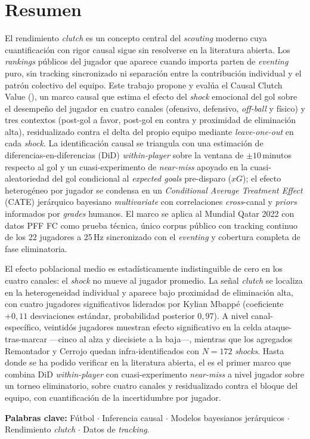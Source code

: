 \chapter*{Resumen}

El rendimiento \textit{clutch} es un concepto central del \textit{scouting}
moderno cuya cuantificación con rigor causal sigue sin resolverse en
la literatura abierta.
Los \textit{rankings} públicos del jugador que aparece cuando importa
parten de \textit{eventing} puro, sin tracking sincronizado ni separación
entre la contribución individual y el patrón colectivo del equipo. Este
trabajo propone y evalúa el Causal Clutch Value (\CCV), un marco causal
que estima el efecto del \textit{shock} emocional del gol sobre el
desempeño del jugador en cuatro canales (ofensivo, defensivo,
\textit{off-ball} y físico) y tres contextos (post-gol a favor, post-gol
en contra y proximidad de eliminación alta), residualizado contra el
delta del propio equipo mediante \textit{leave-one-out} en cada
\textit{shock}. La identificación causal se triangula con una estimación
de diferencias-en-diferencias (DiD) \textit{within-player} sobre la
ventana de $\pm 10$\,minutos respecto al gol y un cuasi-experimento de
\textit{near-miss} apoyado en la cuasi-aleatoriedad del gol condicional
al \textit{expected goals} pre-disparo ($xG$); el efecto heterogéneo por jugador se condensa
en un \textit{Conditional Average Treatment Effect} (CATE) jerárquico
bayesiano \textit{multivariate} con
correlaciones \textit{cross}-canal y \textit{priors} informados por
\textit{grades} humanos. El marco se aplica al Mundial Qatar 2022 con
datos PFF FC como prueba técnica, único corpus público con tracking
continuo de los 22 jugadores a 25\,Hz sincronizado con el
\textit{eventing} y cobertura completa de fase eliminatoria.

El efecto poblacional medio es estadísticamente indistinguible de cero
en los cuatro canales: el \textit{shock} no mueve al jugador promedio.
La señal \textit{clutch} se localiza en la heterogeneidad individual y
aparece bajo proximidad de eliminación alta, con cuatro jugadores
significativos liderados por Kylian Mbappé (coeficiente $+0{,}11$
desviaciones estándar, probabilidad posterior $0{,}97$). A nivel
canal-específico, veintidós jugadores muestran efecto significativo en
la celda ataque-tras-marcar ---cinco al alza y diecisiete a la baja---,
mientras que los agregados Remontador y Cerrojo quedan infra-identificados
con $N=172$ \textit{shocks}. Hasta donde se ha podido verificar en la
literatura abierta, el \CCV es el primer marco que combina DiD
\textit{within-player} con cuasi-experimento \textit{near-miss} a
nivel jugador sobre un torneo eliminatorio, sobre cuatro canales y
residualizado contra el bloque del equipo, con cuantificación de la
incertidumbre por jugador.

\vspace{1em}
\noindent\textbf{Palabras clave:} Fútbol $\cdot$ Inferencia causal $\cdot$
Modelos bayesianos jerárquicos $\cdot$ Rendimiento \textit{clutch} $\cdot$
Datos de \textit{tracking}.

\clearpage
